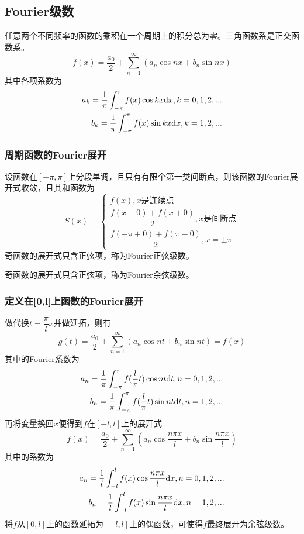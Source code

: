 \subsection{Fourier级数}
任意两个不同频率的函数的乘积在一个周期上的积分总为零。三角函数系是正交函数系。
\begin{equation}\label{key}
	f(x)=\dfrac{a_0}{2}+\sum_{n=1}^{\infty}(a_n \cos nx+b_n\sin nx)
\end{equation}
其中各项系数为
\begin{align}
	a_k=\dfrac{1}{\pi}\int_{-\pi}^{\pi}f(x)\cos kx
	\mathrm{d} x,k=0,1,2,...\\
	b_k=\dfrac{1}{\pi}\int_{-\pi}^{\pi}f(x)\sin kx
	\mathrm{d} x,k=1,2,...
\end{align}
\subsubsection{周期函数的Fourier展开}
设函数在$ [-\pi,\pi] $上分段单调，且只有有限个第一类间断点，则该函数的Fourier展开式收敛，且其和函数为
\begin{equation}\label{key}
	S(x)=
	\begin{cases}
		f(x),x\text{是连续点}\\
		\dfrac{f(x-0)+f(x+0)}{2},x\text{是间断点}\\
		\dfrac{f(-\pi+0)+f(\pi-0)}{2},x=\pm \pi
	\end{cases}
\end{equation}
 奇函数的展开式只含正弦项，称为Fourier正弦级数。

 奇函数的展开式只含正弦项，称为Fourier余弦级数。
\subsubsection{定义在[0,l]上函数的Fourier展开}
做代换$ t=\dfrac{\pi}{l} x$并做延拓，则有
\begin{equation}\label{key}
	g(t)=\dfrac{a_0}{2}+\sum_{n=1}^{\infty}(a_n \cos nt+b_n\sin nt)=f(x)
\end{equation}
其中的Fourier系数为
\begin{align}\label{key}
	a_n=\dfrac{1}{\pi}\int_{-\pi}^{\pi}f(\dfrac{l}{\pi}t)\cos nt\mathrm{d} t,n=0,1,2,...\\
	b_n=\dfrac{1}{\pi}\int_{-\pi}^{\pi}f(\dfrac{l}{\pi}t)\sin nt\mathrm{d} t,n=1,2,...
\end{align}
再将变量换回$x$便得到$ f $在$ [-l,l] $上的展开式
\begin{equation}\label{key}
	f(x)=\dfrac{a_0}{2}+\sum_{n=1}^{\infty}(a_n\cos \dfrac{n\pi x}{l}+b_n \sin \dfrac{n\pi x}{l})
\end{equation}
其中的系数为
\begin{align}\label{key}
	a_n=\dfrac{1}{l}\int_{-l}^{l}f(x)\cos \dfrac{n\pi x}{l}\mathrm{d} x,n=0,1,2,...\\
	b_n=\dfrac{1}{l}\int_{-l}^{l}f(x)\sin \dfrac{n\pi x}{l}\mathrm{d} x,n=1,2,...
\end{align}
将$ f $从$ [0,l] $上的函数延拓为$ [-l,l] $上的偶函数，可使得$ f $最终展开为余弦级数。

